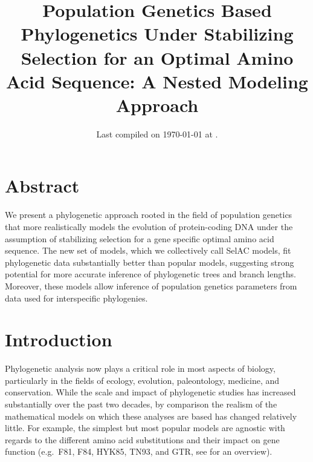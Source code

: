 \documentclass{article}
\title{Population Genetics Based Phylogenetics Under Stabilizing Selection for an Optimal Amino Acid Sequence: A Nested Modeling Approach
} \date{Last compiled on \today\xspace at \currenttime.}
\begin{document}
\maketitle


\section*{Abstract}
We present a phylogenetic approach rooted in the field of population genetics that more realistically models the evolution of protein-coding DNA under the assumption of stabilizing selection for a gene specific optimal amino acid sequence.
The new set of models, which we collectively call SelAC models, fit phylogenetic data substantially better than popular models, suggesting strong potential for more accurate inference of phylogenetic trees and branch lengths.
Moreover, these models allow inference of population genetics parameters from data used for interspecific phylogenies.

\section*{Introduction}
Phylogenetic analysis now plays a critical role in most aspects of biology, particularly in the fields of ecology, evolution, paleontology, medicine, and conservation.
While the scale and impact of phylogenetic studies has increased substantially over the past two decades, by comparison the realism of the mathematical models on which these analyses are based has changed relatively little.
For example, the simplest but most popular models are agnostic with regards to the different amino acid substitutions and their impact on gene function (e.g.~F81, F84, HYK85, TN93, and GTR, see \citet{Yang2014} for an overview).
\end{document}
